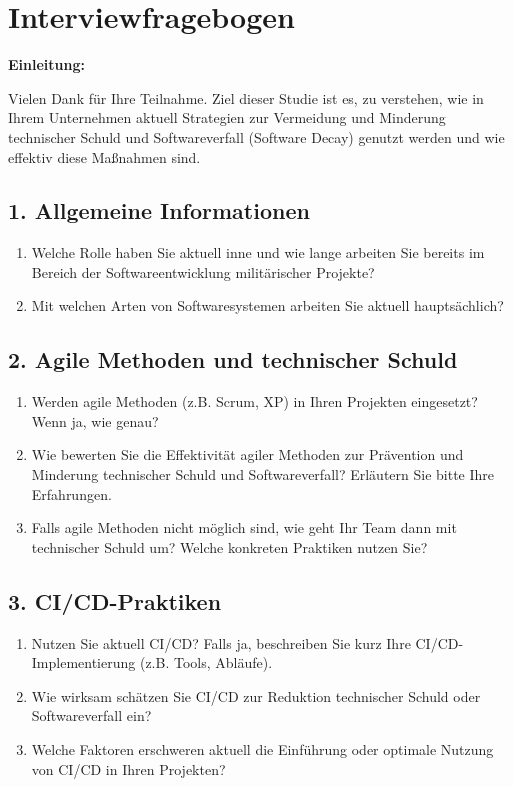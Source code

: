\section*{Interviewfragebogen}
\textbf{Einleitung:}

Vielen Dank für Ihre Teilnahme. Ziel dieser Studie ist es, zu verstehen, wie in Ihrem Unternehmen aktuell Strategien zur Vermeidung und Minderung technischer Schuld und Softwareverfall (Software Decay) genutzt werden und wie effektiv diese Maßnahmen sind.

\subsection*{1. Allgemeine Informationen}

\begin{enumerate}
    \item Welche Rolle haben Sie aktuell inne und wie lange arbeiten Sie bereits im Bereich der Softwareentwicklung militärischer Projekte?
    \item Mit welchen Arten von Softwaresystemen arbeiten Sie aktuell hauptsächlich?
\end{enumerate}

\subsection*{2. Agile Methoden und technischer Schuld}

\begin{enumerate}[resume]
    \item Werden agile Methoden (z.B. Scrum, XP) in Ihren Projekten eingesetzt? Wenn ja, wie genau?
    \item Wie bewerten Sie die Effektivität agiler Methoden zur Prävention und Minderung technischer Schuld und Softwareverfall? Erläutern Sie bitte Ihre Erfahrungen.
    \item Falls agile Methoden nicht möglich sind, wie geht Ihr Team dann mit technischer Schuld um? Welche konkreten Praktiken nutzen Sie?
\end{enumerate}

\subsection*{3. CI/CD-Praktiken}

\begin{enumerate}[resume]
    \item Nutzen Sie aktuell CI/CD? Falls ja, beschreiben Sie kurz Ihre CI/CD-Implementierung (z.B. Tools, Abläufe).
    \item Wie wirksam schätzen Sie CI/CD zur Reduktion technischer Schuld oder Softwareverfall ein?
    \item Welche Faktoren erschweren aktuell die Einführung oder optimale Nutzung von CI/CD in Ihren Projekten?
\end{enumerate}

